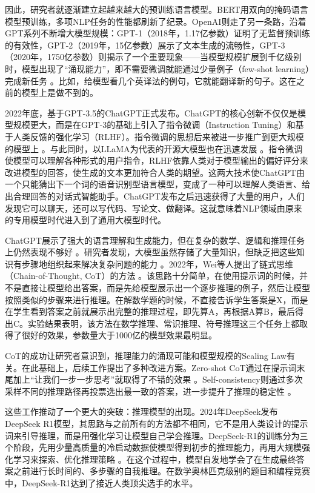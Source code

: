 因此，研究者就逐渐建立起越来越大的预训练语言模型。BERT用双向的掩码语言模型预训练，多项NLP任务的性能都刷新了纪录。OpenAI则走了另一条路，沿着GPT系列不断增大模型规模：GPT-1（2018年，1.17亿参数）证明了无监督预训练的有效性，GPT-2（2019年，15亿参数）展示了文本生成的流畅性，GPT-3（2020年，1750亿参数）则揭示了一个重要现象——当模型规模扩展到千亿级别时，模型出现了“涌现能力”，即不需要微调就能通过少量例子（few-shot learning）完成新任务 。比如，给模型看几个英译法的例句，它就能翻译新的句子。这在之前的模型上是做不到的。

2022年底，基于GPT-3.5的ChatGPT正式发布。ChatGPT的核心创新不仅仅是模型规模更大，而是在GPT-3的基础上引入了指令微调（Instruction Tuning）和基于人类反馈的强化学习（RLHF）。指令微调的思想后来被进一步推广到更大规模的模型上 。与此同时，以LLaMA为代表的开源大模型也在迅速发展 。指令微调使模型可以理解各种形式的用户指令，RLHF依靠人类对于模型输出的偏好评分来改进模型的回答，使生成的文本更加符合人类的期望。这两大技术使ChatGPT由一个只能猜出下一个词的语音识别型语言模型，变成了一种可以理解人类语言、给出合理回答的对话式智能助手。ChatGPT发布之后迅速获得了大量的用户，人们发现它可以聊天，还可以写代码、写论文、做翻译。这就意味着NLP领域由原来的专用模型时代进入到了通用大模型时代。

ChatGPT展示了强大的语言理解和生成能力，但在复杂的数学、逻辑和推理任务上仍然表现不够好 。研究者发现，大模型虽然存储了大量知识，但缺乏把这些知识有步骤地组织起来解决复杂问题的能力 。2022年，Wei等人提出了链式思维（Chain-of-Thought, CoT）的方法 。该思路十分简单，在使用提示词的时候，并不是直接让模型给出答案，而是先给模型展示出一个逐步推理的例子，然后让模型按照类似的步骤来进行推理。在解数学题的时候，不直接告诉学生答案是X，而是在学生看到答案之前就展示出完整的推理过程，即先算A，再根据A算B，最后得出C。实验结果表明，该方法在数学推理、常识推理、符号推理这三个任务上都取得了很好的效果，参数量大于1000亿的模型效果最明显。

CoT的成功让研究者意识到，推理能力的涌现可能和模型规模的Scaling Law有关。在此基础上，后续工作提出了多种改进方案。Zero-shot CoT通过在提示词末尾加上“让我们一步一步思考”就取得了不错的效果 。Self-consistency则通过多次采样不同的推理路径再投票选出最一致的答案，进一步提升了推理的稳定性 。

这些工作推动了一个更大的突破：推理模型的出现。2024年DeepSeek发布DeepSeek R1模型，其思路与之前所有的方法都不相同，它不是用人类设计的提示词来引导推理，而是用强化学习让模型自己学会推理。DeepSeek-R1的训练分为三个阶段，先用少量高质量的冷启动数据使模型得到初步的推理能力，再用大规模强化学习来探索、优化推理策略 。在这个过程中，模型自发地学会了在生成最终答案之前进行长时间的、多步骤的自我推理。在数学奥林匹克级别的题目和编程竞赛中，DeepSeek-R1达到了接近人类顶尖选手的水平。

